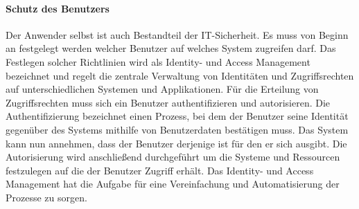 \documentclass[utf8,biblatex]{lni}
\begin{document}
\paragraph{Schutz des Benutzers}\label{Schutz_des_Benutzers}
Der Anwender selbst ist auch Bestandteil der IT-Sicherheit. Es muss von Beginn an festgelegt werden welcher Benutzer auf welches System zugreifen darf. 
Das Festlegen solcher Richtlinien wird als \glqq Identity- und Access Management\grqq{} bezeichnet und regelt die zentrale Verwaltung von Identitäten und Zugriffsrechten auf unterschiedlichen
Systemen und Applikationen. Für die Erteilung von Zugriffsrechten muss sich ein Benutzer authentifizieren und autorisieren. 
Die Authentifizierung bezeichnet einen Prozess, bei dem der Benutzer seine Identität gegenüber des Systems mithilfe von Benutzerdaten bestätigen muss. Das System kann nun annehmen, dass der Benutzer derjenige ist für den er sich ausgibt.
Die Autorisierung 
wird anschließend durchgeführt um die Systeme und Ressourcen festzulegen auf die der Benutzer Zugriff erhält. Das Identity- und Access Management hat die 
Aufgabe für eine Vereinfachung und Automatisierung der Prozesse zu sorgen. 
\end{document}
